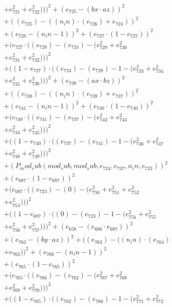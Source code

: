 \documentclass[10pt, a4paper]{article}
\begin{document}
\begin{small}
\begin{align*}
& + e_{721}^{2} + e_{722}^{2})))^{2} + (e_{725} - (bx  \cdot  az))^{2} \\
& + ((e_{725}) - ((n_in)  \cdot  (e_{726}) + e_{724}))^{2} \\
& + (e_{728} - (n_in - 1))^{2} + (e_{727}  \cdot  (1 - e_{727}))^{2} \\
& + (e_{727}  \cdot  ((e_{728}) - (e_{724}) - (e_{729}^{2} + e_{730}^{2} \\
& + e_{731}^{2} + e_{732}^{2})))^{2} \\
& + ((1 - e_{727})  \cdot  ((e_{724}) - (e_{728}) - 1 - (e_{733}^{2} + e_{734}^{2} \\
& + e_{735}^{2} + e_{736}^{2})))^{2} + (e_{738} - (ax  \cdot  bz))^{2} \\
& + ((e_{738}) - ((n_in)  \cdot  (e_{739}) + e_{737}))^{2} \\
& + (e_{741} - (n_in - 1))^{2} + (e_{740}  \cdot  (1 - e_{740}))^{2} \\
& + (e_{740}  \cdot  ((e_{741}) - (e_{737}) - (e_{742}^{2} + e_{743}^{2} \\
& + e_{744}^{2} + e_{745}^{2})))^{2} \\
& + ((1 - e_{740})  \cdot  ((e_{737}) - (e_{741}) - 1 - (e_{746}^{2} + e_{747}^{2} \\
& + e_{748}^{2} + e_{749}^{2})))^{2} \\
& + (P_mod_sub(mod_sub, mod_sub, e_{724}, e_{737}, n_in, e_{723}))^{2} \\
& + (e_{687}  \cdot  (1 - e_{687}))^{2} \\
& + (e_{687}  \cdot  ((e_{723}) - (0) - (e_{750}^{2} + e_{751}^{2} + e_{752}^{2} \\
& + e_{753}^{2})))^{2} \\
& + ((1 - e_{687})  \cdot  ((0) - (e_{723}) - 1 - (e_{754}^{2} + e_{755}^{2} \\
& + e_{756}^{2} + e_{757}^{2})))^{2} + (e_{658} - (e_{686}  \cdot  e_{687}))^{2} \\
& + (e_{763} - (by  \cdot  az))^{2} + ((e_{763}) - ((n_in)  \cdot  (e_{764}) \\
& + e_{762}))^{2} + (e_{766} - (n_in - 1))^{2} \\
& + (e_{765}  \cdot  (1 - e_{765}))^{2} \\
& + (e_{765}  \cdot  ((e_{766}) - (e_{762}) - (e_{767}^{2} + e_{768}^{2} \\
& + e_{769}^{2} + e_{770}^{2})))^{2} \\
& + ((1 - e_{765})  \cdot  ((e_{762}) - (e_{766}) - 1 - (e_{771}^{2} + e_{772}^{2} \\

\end{align*}
\end{small}
\end{document}
